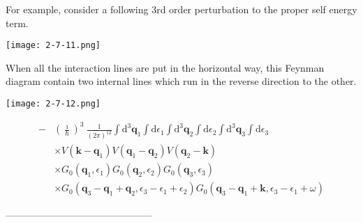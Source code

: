 For example, consider a following 3rd order perturbation to the proper self energy term.
\begin{center}
\label{Fig2.7.11} \texttt{[image: 2-7-11.png]}
\end{center}

When all the interaction lines are put in the horizontal way, this Feynman diagram contain two internal lines which run in the reverse direction to the other.
\begin{center}
\label{Fig2.7.12} \texttt{[image: 2-7-12.png]}
\end{center}

\[ \begin{split}
-&\left(\frac{\imath}{\hbar}\right)^3 \ \frac{1}{(2\pi)^{12}} \int \mathrm{d}^3 \mathbf{q}_1 \int \mathrm{d} \epsilon_1 \int \mathrm{d}^3 \mathbf{q}_2 \int \mathrm{d} \epsilon_2 \int \mathrm{d}^3 \mathbf{q}_3 \int \mathrm{d} \epsilon_3 \\
&\times V(\mathbf{k}-\mathbf{q}_1)V(\mathbf{q}_1-\mathbf{q}_2)V(\mathbf{q}_2-\mathbf{k})\\
&\times G_0(\mathbf{q}_1,\epsilon_1)G_0(\mathbf{q}_2,\epsilon_2)G_0(\mathbf{q}_3,\epsilon_3)\\
&\times G_0(\mathbf{q}_3-\mathbf{q}_1+\mathbf{q}_2,\epsilon_3-\epsilon_1+\epsilon_2)G_0(\mathbf{q}_3-\mathbf{q}_1+\mathbf{k},\epsilon_3-\epsilon_1+\omega)
\end{split} \]
\begin{center}---------------------------------------------\end{center}
